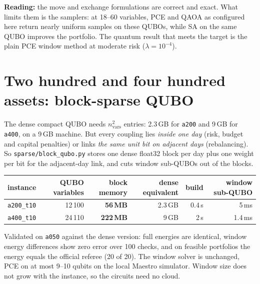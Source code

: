 \documentclass[11pt]{article}
\begin{document}
\noindent\textbf{Reading:} the move and exchange formulations are correct and exact. What limits them
is the samplers: at 18--60 variables, PCE and QAOA as configured here return nearly uniform samples on
these QUBOs, while SA on the same QUBO improves the portfolio. The quantum result that meets the target
is the plain PCE window method at moderate risk ($\lambda=10^{-4}$).

\section{Two hundred and four hundred assets: block-sparse QUBO}\label{sec:sparse}
The dense compact QUBO needs $n_\text{vars}^2$ entries: 2.3\,GB for \texttt{a200} and 9\,GB for
\texttt{a400}, on a 9\,GB machine. But every coupling lies \emph{inside one day} (risk, budget and capital
penalties) or links \emph{the same unit bit on adjacent days} (rebalancing). So \texttt{sparse/block\_qubo.py}
stores one dense float32 block per day plus one weight per bit for the adjacent-day link, and cuts
window sub-QUBOs out of the blocks.

\begin{center}\small
\begin{tabularx}{\textwidth}{@{}Lrrrrr@{}}
\toprule
instance & QUBO variables & block memory & dense equivalent & build & window sub-QUBO\\
\midrule
\texttt{a200\_t10} & 12\,100 & \textbf{56\,MB} & 2.3\,GB & 0.4\,s & 5\,ms\\
\texttt{a400\_t10} & 24\,110 & \textbf{222\,MB} & 9\,GB & 2\,s & 1.4\,ms\\
\bottomrule
\end{tabularx}
\end{center}
\noindent Validated on \texttt{a050} against the dense version: full energies are identical, window
energy differences show zero error over 100 checks, and on feasible portfolios the energy equals the
official referee (20 of 20). The window solver is unchanged, PCE on at most 9--10 qubits on the local
Maestro simulator. Window size does not grow with the instance, so the circuits need no cloud.
\end{document}
